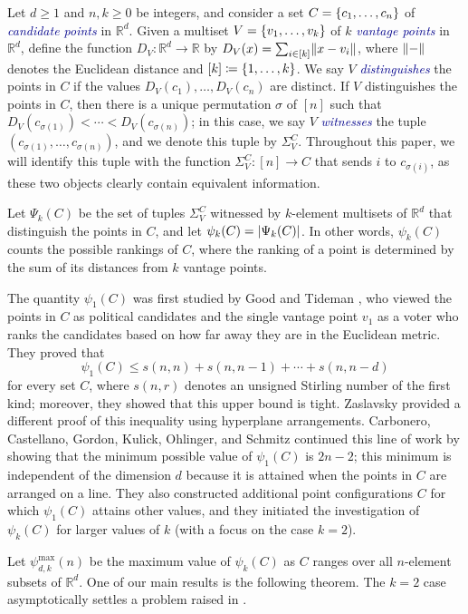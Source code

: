 \documentclass[11pt]{amsart}
\theoremstyle{definition}
\DeclarePairedDelimiter{\set}{\{}{\}}
\DeclarePairedDelimiter{\abs}{\lvert}{\rvert}
\DeclarePairedDelimiter{\Abs}{\lVert}{\rVert}
\newcommand{\perm}{\psi^{\mathrm{max}}}
\newcommand{\RR}{\mathbb{R}}
\newcommand{\dfn}[1]{\textcolor{darkblue}{\emph{#1}}}
\begin{document}
Let $d \geq 1$ and $n, k \geq 0$ be integers, and consider a set $C=\set{c_1,\ldots,c_n}$ of \dfn{candidate points} in $\RR^d$. Given a multiset $V=\set{v_1,\ldots,v_k}$ of $k$ \dfn{vantage points} in $\RR^d$,
define the function $D_V\colon \RR^d \to \RR$ by $D_V(x) = \sum_{i\in[k]} \Abs{x - v_i}$, where $\Abs{-}$ denotes the Euclidean distance and $[k]\coloneqq\set{1,\ldots,k}$. We say $V$ \dfn{distinguishes} the points in $C$ if the values $D_V(c_1),\ldots,D_V(c_n)$ are distinct. If $V$ distinguishes the points in $C$, then there is a unique permutation $\sigma$ of $[n]$ such that $D_V(c_{\sigma(1)})<\cdots<D_V(c_{\sigma(n)})$; in this case, we say $V$ \dfn{witnesses} the tuple $(c_{\sigma(1)},\ldots,c_{\sigma(n)})$, and we denote this tuple by $\Sigma_V^C$. Throughout this paper, we will identify this tuple with the function $\Sigma_V^C \colon [n] \to C$ that sends $i$ to $c_{\sigma(i)}$, as these two objects clearly contain equivalent information.

Let $\Psi_k(C)$ be the set of tuples $\Sigma_V^C$ witnessed by $k$-element multisets of $\RR^d$ that distinguish the points in $C$, and let $\psi_k(C)=\abs{\Psi_k(C)}$. In other words, $\psi_k(C)$ counts the possible rankings of $C$, where the ranking of a point is determined by the sum of its distances from $k$ vantage points.

The quantity $\psi_1(C)$ was first studied by Good and Tideman \cite{Good1977}, who viewed the points in $C$ as political candidates and the single vantage point $v_1$ as a voter who ranks the candidates based on how far away they are in the Euclidean metric. They proved that \[\psi_1(C) \leq s(n,n)+s(n,n-1)+\cdots+s(n,n-d)\] for every set $C$, where $s(n,r)$ denotes an unsigned Stirling number of the first kind; moreover, they showed that this upper bound is tight. Zaslavsky \cite{Zaslavsky2002} provided a different proof of this inequality using hyperplane arrangements. Carbonero, Castellano, Gordon, Kulick, Ohlinger, and Schmitz \cite{Carbonero2021} continued this line of work by showing that the minimum possible value of $\psi_1(C)$ is $2n-2$; this minimum is independent of the dimension $d$ because it is attained when the points in $C$ are arranged on a line. They also constructed additional point configurations $C$ for which $\psi_1(C)$ attains other values, and they initiated the investigation of $\psi_k(C)$ for larger values of $k$ (with a focus on the case $k=2$). 

Let $\perm_{d,k}(n)$ be the maximum value of $\psi_k(C)$ as $C$ ranges over all $n$-element subsets of $\RR^d$. One of our main results is the following theorem. 
The $k=2$ case asymptotically settles a problem raised in \cite{Carbonero2021}.
\end{document}
